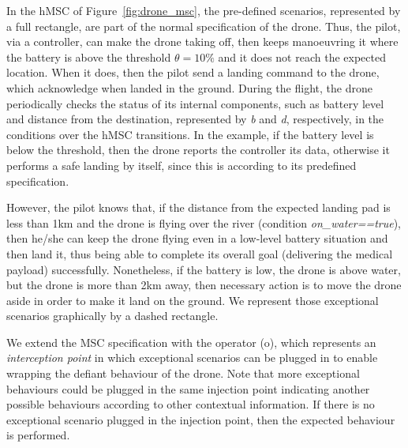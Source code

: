 In the hMSC of Figure~\ref{fig:drone_msc}, the pre-defined scenarios, represented by a full rectangle, are part of the normal specification of the drone. Thus, the pilot, via a controller, can make the drone taking off, then keeps manoeuvring it where the battery is above the threshold $\theta = 10\%$  and it does not reach the expected location. When it does, then the pilot send a landing command to the drone, which acknowledge when landed in the ground.  During the flight, the drone periodically checks the status of its internal components, such as battery level and distance from the destination, represented by \textit{b} and \textit{d}, respectively, in the conditions over the hMSC transitions. In the example, if the battery level is below the threshold, then the drone reports the controller its data, otherwise it performs a safe landing by itself, since this is according to its predefined specification. 

However, the pilot knows that, if the distance from the expected landing pad is less than 1km and the drone is flying over the river (condition \textit{on\_water==true}), then he/she can keep the drone flying even in a low-level battery situation and then land it, thus being able to complete its overall goal (delivering the medical payload) successfully. Nonetheless, if the battery is low, the drone is above water, but the drone is more than 2km away, then necessary action is to move the drone aside in order to make it land on the ground. We represent those exceptional scenarios graphically by a dashed rectangle.  

We extend the MSC specification with the operator (o), which represents an \textit{interception point} in which exceptional scenarios can be plugged in to enable  wrapping the defiant behaviour of the drone. Note that more exceptional behaviours could be plugged in the same injection point indicating another possible behaviours according to other contextual information. If there is no exceptional scenario plugged in the injection point, then the expected behaviour is performed.



